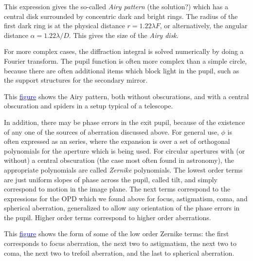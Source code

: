 \documentclass[12pt]{article}
\begin{document}
This expression gives the so-called \emph{Airy pattern} (the solution?)
which has a central disk surrounded by concentric dark and bright rings.
The radius of the first dark ring is at the physical distance
$r = 1.22\lambda F$, or alternatively, the angular distance
$\alpha = 1.22\lambda/D$. This gives the size of the \emph{Airy disk}.

For more complex cases, the diffraction integral is solved
numerically by doing a Fourier transform. The pupil function is often
more complex than a simple circle, because there are often additional
items which block light in the pupil, such as the support structures
for the secondary mirror.

This \href{http://astronomy.nmsu.edu/holtz/a535/html/diagrams/a535/airy.htm}
{\textcolor{blue}{figure}} shows the Airy pattern, both without obscurations,
and with a central obscuration and spiders in a setup typical of a telescope.

In addition, there may be phase errors in the exit pupil, because of
the existence of any one of the sources of aberration discussed
above. For general use, $\phi$ is often expressed as an series,
where the expansion is over a set of orthogonal polynomials for the
aperture which is being used. For circular apertures with (or
without) a central obscuration (the case most often found in
astronomy), the appropriate polynomials are called \emph{Zernike}
polynomials. The lowest order terms are just uniform slopes of phase
across the pupil, called tilt, and simply correspond to motion in the
image plane. The next terms correspond to the expressions for the OPD
which we found above for focus, astigmatism, coma, and spherical
aberration, generalized to allow any orientation of the phase errors
in the pupil. Higher order terms correspond to higher order
aberrations.

This \href{http://astronomy.nmsu.edu/holtz/a535/html/diagrams/a535/zernike.htm}
{\textcolor{blue}{figure}} shows the form of some of the low order Zernike terms:
the first corresponds to focus aberration, the next two to
astigmatism, the next two to coma, the next two to trefoil
aberration, and the last to spherical aberration.
\end{document}
